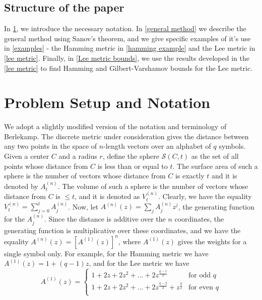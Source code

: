 \documentclass[conference,letterpaper]{IEEEtran}
\begin{document}
\subsection{Structure of the paper}
In \cref{setup}, we introduce the necessary notation. In \cref{general method} we describe the general method using Sanov's theorem, and we give specific examples of it's use in \cref{examples} -  the Hamming metric in \cref{hamming example} and the Lee metric in \cref{lee metric}. Finally, in \cref{Lee metric bounds}, we use the results developed in the \cref{lee metric} to find Hamming and Gilbert-Varshamov bounds for the Lee metric.

\section{Problem Setup and Notation}\label{setup}
    We adopt a slightly modified version of the notation and terminology of Berlekamp\cite{Berlekamp:2015:ACT:2834146}. The discrete metric under consideration gives the distance between any two points in the space of $n$-length vectors over an alphabet of $q$ symbols. Given a center $C$ and a radius $r$, define the sphere $\mathcal{S}(C,t)$ as the set of all points whose distance from $C$ is less than or equal to $t$. The surface area of such a sphere is the number of vectors whose distance from $C$ is exactly $t$ and it is denoted by $A_t^{(n)}$. The volume of such a sphere is the number of vectors whose distance from $C$ is $\leq t$, and it is denoted as $V_t^{(n)}$. Clearly, we have the equality $V_t^{(n)} = \sum_{j = 0}^t A_j^{(n)}$. Now, let $A^{(n)}(z) = \sum_{j} A_j^{(n)} z^j$, the generating function for the $A_j^{(n)}$. Since the distance is additive over the $n$ coordinates, the generating function is multiplicative over these coordinates, and we have the equality $A^{(n)}(z) = [A^{(1)}(z)]^n$, where $A^{(1)}(z)$ gives the weights for a single symbol only. For example, for the Hamming metric we have $A^{(1)}(z) = 1 + (q-1)z$, and for the Lee metric we have
    \begin{equation}
        A^{(1)}(z) = 
            \begin{cases}
                1 + 2z + 2z^2 + \ldots + 2z^{\frac{q-1}{2}} & \text{for odd $q$} \\
                1 + 2z + 2z^2 + \ldots + 2z^{\frac{q-2}{2}} + z^{\frac{q}{2}} & \text{for even $q$} \\
            \end{cases}
    \end{equation}
    
\end{document}
